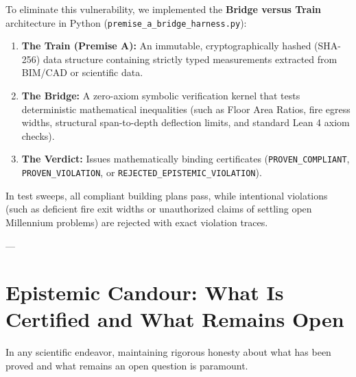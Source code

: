 \documentclass[11pt,a4paper]{article}
\begin{document}
To eliminate this vulnerability, we implemented the \textbf{Bridge versus Train} architecture in Python (\texttt{premise\_a\_bridge\_harness.py}):
\begin{enumerate}
    \item \textbf{The Train (Premise A):} An immutable, cryptographically hashed (SHA-256) data structure containing strictly typed measurements extracted from BIM/CAD or scientific data.
    \item \textbf{The Bridge:} A zero-axiom symbolic verification kernel that tests deterministic mathematical inequalities (such as Floor Area Ratios, fire egress widths, structural span-to-depth deflection limits, and standard Lean 4 axiom checks).
    \item \textbf{The Verdict:} Issues mathematically binding certificates (\texttt{PROVEN\_COMPLIANT}, \texttt{PROVEN\_VIOLATION}, or \texttt{REJECTED\_EPISTEMIC\_VIOLATION}).
\end{enumerate}
In test sweeps, all compliant building plans pass, while intentional violations (such as deficient fire exit widths or unauthorized claims of settling open Millennium problems) are rejected with exact violation traces.

---

\section{Epistemic Candour: What Is Certified and What Remains Open}

In any scientific endeavor, maintaining rigorous honesty about what has been proved and what remains an open question is paramount.
\end{document}
